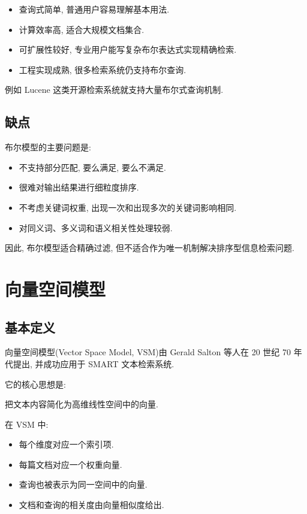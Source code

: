 \begin{itemize}
\item 查询式简单, 普通用户容易理解基本用法.
\item 计算效率高, 适合大规模文档集合.
\item 可扩展性较好, 专业用户能写复杂布尔表达式实现精确检索.
\item 工程实现成熟, 很多检索系统仍支持布尔查询.
\end{itemize}

例如 Lucene 这类开源检索系统就支持大量布尔式查询机制.

\subsection{缺点}


布尔模型的主要问题是:

\begin{itemize}
\item 不支持部分匹配, 要么满足, 要么不满足.
\item 很难对输出结果进行细粒度排序.
\item 不考虑关键词权重, 出现一次和出现多次的关键词影响相同.
\item 对同义词、多义词和语义相关性处理较弱.
\end{itemize}

因此, 布尔模型适合精确过滤,
但不适合作为唯一机制解决排序型信息检索问题.

\section{向量空间模型}


\subsection{基本定义}


向量空间模型(Vector Space Model, VSM)由 Gerald Salton 等人在 20 世纪 70 年代提出,
并成功应用于 SMART 文本检索系统.

它的核心思想是:

把文本内容简化为高维线性空间中的向量.

在 VSM 中:

\begin{itemize}
\item 每个维度对应一个索引项.
\item 每篇文档对应一个权重向量.
\item 查询也被表示为同一空间中的向量.
\item 文档和查询的相关度由向量相似度给出.
\end{itemize}

